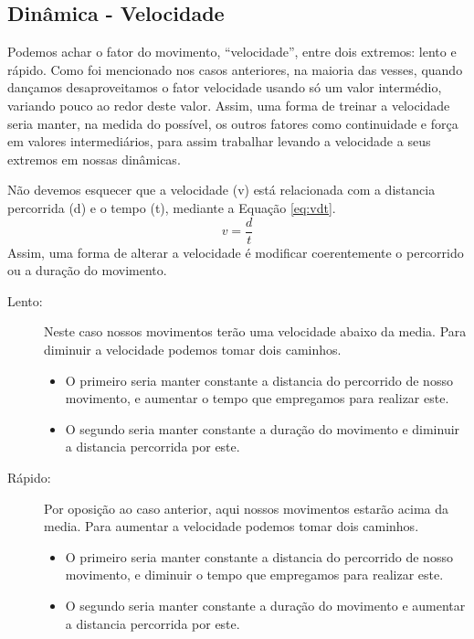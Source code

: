 \subsection{Dinâmica - Velocidade }
\label{subsec:dinamica:velocidade}


Podemos achar o fator do movimento, ``velocidade'', entre dois extremos: lento e  rápido.
Como foi mencionado nos casos anteriores, 
na maioria das vesses, 
quando dançamos desaproveitamos o fator velocidade usando só um valor intermédio,
variando  pouco ao redor deste valor.
Assim, uma forma de treinar a velocidade seria manter, na medida do possível,
os outros fatores como continuidade e força em valores intermediários,
para assim trabalhar levando a velocidade a seus extremos em nossas dinâmicas.

Não devemos esquecer que a velocidade (v) está relacionada com a distancia percorrida (d) e o tempo (t),
mediante a Equação \ref{eq:vdt}.
\begin{equation}
\label{eq:vdt}
v=\frac{d}{t}
\end{equation}
Assim, 
uma forma de alterar a velocidade é modificar coerentemente o percorrido ou a duração do movimento.


\begin{description}
\item[Lento:] Neste caso nossos movimentos terão uma velocidade abaixo da media.
Para diminuir a velocidade podemos tomar dois caminhos.
\begin{itemize}
\item O primeiro seria manter constante a distancia do percorrido de nosso movimento,
e aumentar o tempo que empregamos para realizar este.
\item O segundo seria manter constante a duração do movimento e diminuir a distancia percorrida por este. 
\end{itemize}
\item[Rápido:] Por oposição ao caso anterior, 
aqui nossos movimentos estarão acima da media.
Para aumentar a velocidade podemos tomar dois caminhos.
\begin{itemize}
\item O primeiro seria manter constante a distancia do percorrido de nosso movimento,
e diminuir o tempo que empregamos para realizar este.
\item O segundo seria manter constante a duração do movimento e aumentar a distancia percorrida por este. 
\end{itemize}
\end{description}

